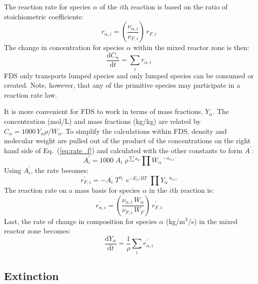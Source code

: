 The reaction rate for species $\alpha$ of the $i$th reaction is based on the ratio of stoichiometric coefficients:
\begin{equation}\label{eq:rate_a}
r_{\alpha,i}= \left(\frac{\nu_{\alpha,i}}{\nu_{F,i}}\right)\,r_{F,i}
\end{equation}
The change in concentration for species $\alpha$ within the mixed reactor zone is then:
\begin{equation}\label{rate_expression}
\frac{\mbox{d} C_{\alpha}}{\mbox{d}t} = \sum_{i} r_{\alpha,i}
\end{equation}
FDS only transports lumped species and only lumped species can be consumed or created.  Note, however, that any of the primitive species may participate in a reaction rate law.

It is more convenient for FDS to work in terms of mass fractions, $Y_{\alpha}$.  The concentration (mol/L) and mass fractions (kg/kg) are related by $C_{\alpha}=1000\,Y_{\alpha} \rho/W_{\alpha}$.
To simplify the calculations within FDS, density and molecular weight are pulled out of the product of the concentrations on the right hand side of Eq.~(\ref{eq:rate_f}) and calculated with the other constants to form $A^{\prime}$:
\begin{equation}\label{eq:aprime}
A^{\prime}_{i} = 1000\;A_{i}\;\rho^{\sum a_{\alpha}}\prod W_{\alpha}\,^{-a_{\alpha,i}}
\end{equation}
Using $A_i^{\prime}$, the rate becomes:
\begin{equation}\label{eq:finite_rate_fin}
r^{\prime}_{F,i} = -A_i^{\prime}\;T^{n_i}\;e^{-E_i/RT}\;\prod Y_{\alpha}\,^{a_{\alpha,i}}
\end{equation}
The reaction rate on a mass basis for species $\alpha$ in the $i$th reaction is:
\begin{equation}\label{eq:rate_a_y}
r^{\prime}_{\alpha,i}= \left(\frac{\nu_{\alpha,i}\,W_{\alpha}}{\nu_{F,i}\,W_{F}}\right)\,r^{\prime}_{F,i}
\end{equation}
Last, the rate of change in composition for species $\alpha$ (kg/m$^3$/s) in the mixed reactor zone becomes:
\begin{equation}\label{rate_expression_y}
\frac{\mbox{d}Y_{\alpha}}{\mbox{d}t} = \frac{1}{\rho}\sum_{i} r^{\prime}_{\alpha,i}
\end{equation}


\subsection{Extinction}

